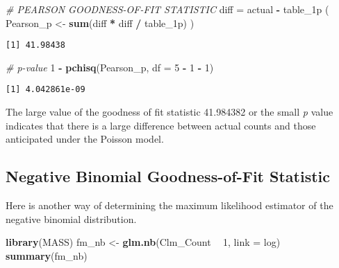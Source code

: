 \documentclass[]{book}
\newenvironment{Shaded}{\begin{snugshade}}{\end{snugshade}}
\newcommand{\KeywordTok}[1]{\textcolor[rgb]{0.13,0.29,0.53}{\textbf{#1}}}
\newcommand{\DataTypeTok}[1]{\textcolor[rgb]{0.13,0.29,0.53}{#1}}
\newcommand{\DecValTok}[1]{\textcolor[rgb]{0.00,0.00,0.81}{#1}}
\newcommand{\StringTok}[1]{\textcolor[rgb]{0.31,0.60,0.02}{#1}}
\newcommand{\CommentTok}[1]{\textcolor[rgb]{0.56,0.35,0.01}{\textit{#1}}}
\newcommand{\OperatorTok}[1]{\textcolor[rgb]{0.81,0.36,0.00}{\textbf{#1}}}
\newcommand{\NormalTok}[1]{#1}
\theoremstyle{definition}
\theoremstyle{definition}
\theoremstyle{definition}
\theoremstyle{remark}
\begin{document}
\begin{Shaded}
\begin{Highlighting}[]
\CommentTok{# PEARSON GOODNESS-OF-FIT STATISTIC}
\NormalTok{diff =}\StringTok{ }\NormalTok{actual }\OperatorTok{-}\StringTok{ }\NormalTok{table_1p}
\NormalTok{( Pearson_p <-}\StringTok{ }\KeywordTok{sum}\NormalTok{(diff }\OperatorTok{*}\StringTok{ }\NormalTok{diff }\OperatorTok{/}\StringTok{ }\NormalTok{table_1p) )}
\end{Highlighting}
\end{Shaded}

\begin{verbatim}
[1] 41.98438
\end{verbatim}

\begin{Shaded}
\begin{Highlighting}[]
\CommentTok{# p-value}
\DecValTok{1} \OperatorTok{-}\StringTok{ }\KeywordTok{pchisq}\NormalTok{(Pearson_p, }\DataTypeTok{df =} \DecValTok{5} \OperatorTok{-}\StringTok{ }\DecValTok{1} \OperatorTok{-}\StringTok{ }\DecValTok{1}\NormalTok{)}
\end{Highlighting}
\end{Shaded}

\begin{verbatim}
[1] 4.042861e-09
\end{verbatim}

The large value of the goodness of fit statistic 41.984382 or the small
\emph{p} value indicates that there is a large difference between actual
counts and those anticipated under the Poisson model.

\subsection{Negative Binomial Goodness-of-Fit
Statistic}\label{negative-binomial-goodness-of-fit-statistic}

Here is another way of determining the maximum likelihood estimator of
the negative binomial distribution.

\begin{Shaded}
\begin{Highlighting}[]
\KeywordTok{library}\NormalTok{(MASS)}
\NormalTok{fm_nb <-}\StringTok{ }\KeywordTok{glm.nb}\NormalTok{(Clm_Count }\OperatorTok{~}\StringTok{ }\DecValTok{1}\NormalTok{, }\DataTypeTok{link =}\NormalTok{ log)}
\KeywordTok{summary}\NormalTok{(fm_nb)}
\end{Highlighting}
\end{Shaded}
\end{document}
